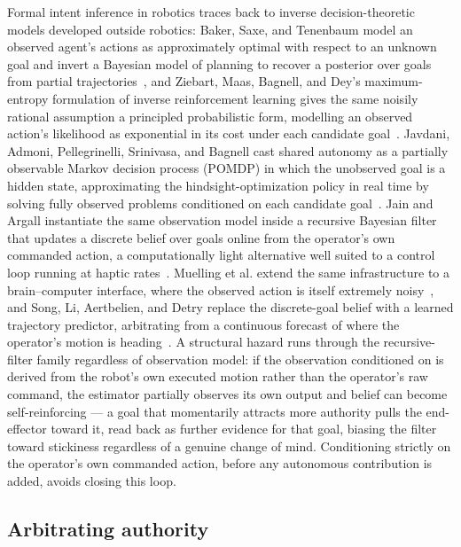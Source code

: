 \documentclass[12pt,a4paper,twoside,openright]{report}
\begin{document}
Formal intent inference in robotics traces back to inverse decision-theoretic models developed outside robotics: Baker, Saxe, and Tenenbaum model an observed agent's actions as approximately optimal with respect to an unknown goal and invert a Bayesian model of planning to recover a posterior over goals from partial trajectories~\cite{baker2009action}, and Ziebart, Maas, Bagnell, and Dey's maximum-entropy formulation of inverse reinforcement learning gives the same noisily rational assumption a principled probabilistic form, modelling an observed action's likelihood as exponential in its cost under each candidate goal~\cite{ziebart2008maxent}. Javdani, Admoni, Pellegrinelli, Srinivasa, and Bagnell cast shared autonomy as a partially observable Markov decision process (POMDP) in which the unobserved goal is a hidden state, approximating the hindsight-optimization policy in real time by solving fully observed problems conditioned on each candidate goal~\cite{javdani2018hindsight}. Jain and Argall instantiate the same observation model inside a recursive Bayesian filter that updates a discrete belief over goals online from the operator's own commanded action, a computationally light alternative well suited to a control loop running at haptic rates~\cite{jain2020probabilistic}. Muelling et al. extend the same infrastructure to a brain--computer interface, where the observed action is itself extremely noisy~\cite{muelling2017autonomyinfused}, and Song, Li, Aertbelien, and Detry replace the discrete-goal belief with a learned trajectory predictor, arbitrating from a continuous forecast of where the operator's motion is heading~\cite{song2024trajectron}. A structural hazard runs through the recursive-filter family regardless of observation model: if the observation conditioned on is derived from the robot's own executed motion rather than the operator's raw command, the estimator partially observes its own output and belief can become self-reinforcing --- a goal that momentarily attracts more authority pulls the end-effector toward it, read back as further evidence for that goal, biasing the filter toward stickiness regardless of a genuine change of mind. Conditioning strictly on the operator's own commanded action, before any autonomous contribution is added, avoids closing this loop.

\subsection{Arbitrating authority}
\label{sec:sota-arbitration}
\end{document}
